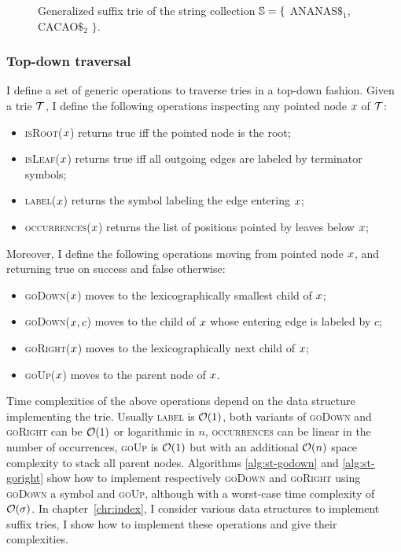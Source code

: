 \begin{figure}[h]
\caption[Example of generalized suffix trie]{Generalized suffix trie of the string collection $\mathbb {S} = \{$ {\ttfamily ANANAS$\$_1$}, {\ttfamily CACAO$\$_2$} $\}$.}
\label{fig:gstrie}
\begin{center}

\end{center}
\end{figure}

\subsubsection{Top-down traversal}

I define a set of generic operations to traverse tries in a top-down fashion.
Given a trie $\mathcal {T}$, I define the following operations inspecting any pointed node $x$ of $\mathcal {T}$:
\begin{itemize}
\item \textsc{isRoot}($x$) returns true iff the pointed node is the root;
\item \textsc{isLeaf}($x$) returns true iff all outgoing edges are labeled by terminator symbols;
\item \textsc{label}($x$) returns the symbol labeling the edge entering $x$;
\item \textsc{occurrences}($x$) returns the list of positions pointed by leaves below $x$;
\end{itemize}
Moreover, I define the following operations moving from pointed node $x$, and returning true on success and false otherwise:
\begin{itemize}
\item \textsc{goDown}($x$) moves to the lexicographically smallest child of $x$;
\item \textsc{goDown}($x, c$) moves to the child of $x$ whose entering edge is labeled by $c$;
\item \textsc{goRight}($x$) moves to the lexicographically next child of $x$;
\item \textsc{goUp}($x$) moves to the parent node of $x$.
\end{itemize}

Time complexities of the above operations depend on the data structure implementing the trie.
Usually \textsc{label} is $\mathcal{O}(1)$, both variants of \textsc{goDown} and \textsc{goRight} can be $\mathcal{O}(1)$ or logarithmic in $n$, \textsc{occurrences} can be linear in the number of occurrences, \textsc{goUp} is $\mathcal{O}(1)$ but with an additional $\mathcal{O}(n)$ space complexity to stack all parent nodes.
Algorithms \ref{alg:st-godown} and \ref{alg:st-goright} show how to implement respectively \textsc{goDown} and \textsc{goRight} using \textsc{goDown} a symbol and \textsc{goUp}, although with a worst-case time complexity of $\mathcal{O}(\sigma)$.
In chapter~\ref{chr:index}, I consider various data structures to implement suffix tries, I show how to implement these operations and give their complexities.

